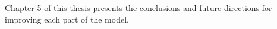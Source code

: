 Chapter 5 of this thesis presents the conclusions and future directions for improving each part of the model.

